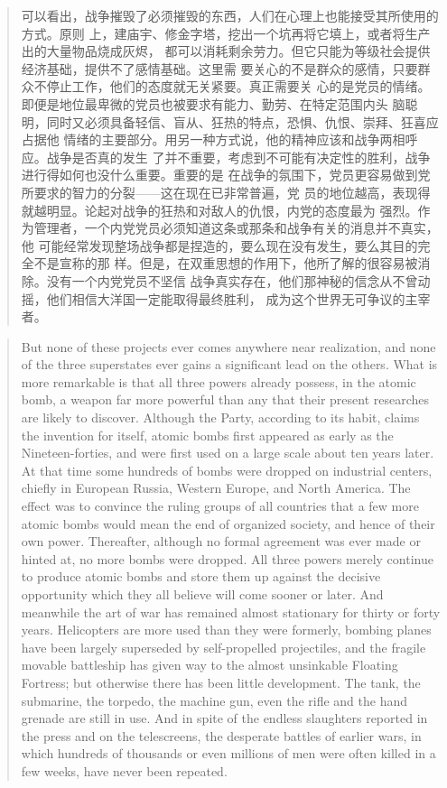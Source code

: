 \begin{paracol}{2}
\switchcolumn

\begin{quotation}
可以看出，战争摧毁了必须摧毁的东西，人们在心理上也能接受其所使用的方式。原则
上，建庙宇、修金字塔，挖出一个坑再将它填上，或者将生产出的大量物品烧成灰烬，
都可以消耗剩余劳力。但它只能为等级社会提供经济基础，提供不了感情基础。这里需
要关心的不是群众的感情，只要群众不停止工作，他们的态度就无关紧要。真正需要关
心的是党员的情绪。即便是地位最卑微的党员也被要求有能力、勤劳、在特定范围内头
脑聪明，同时又必须具备轻信、盲从、狂热的特点，恐惧、仇恨、崇拜、狂喜应占据他
情绪的主要部分。用另一种方式说，他的精神应该和战争两相呼应。战争是否真的发生
了并不重要，考虑到不可能有决定性的胜利，战争进行得如何也没什么重要。重要的是
在战争的氛围下，党员更容易做到党所要求的智力的分裂——这在现在已非常普遍，党
员的地位越高，表现得就越明显。论起对战争的狂热和对敌人的仇恨，内党的态度最为
强烈。作为管理者，一个内党党员必须知道这条或那条和战争有关的消息并不真实，他
可能经常发现整场战争都是捏造的，要么现在没有发生，要么其目的完全不是宣称的那
样。但是，在双重思想的作用下，他所了解的很容易被消除。没有一个内党党员不坚信
战争真实存在，他们那神秘的信念从不曾动摇，他们相信大洋国一定能取得最终胜利，
成为这个世界无可争议的主宰者。
\end{quotation}

\switchcolumn*

\begin{quotation}
But none of these projects ever comes anywhere near realization, and
none of the three superstates ever gains a significant lead on the
others. What is more remarkable is that all three powers already
possess, in the atomic bomb, a weapon far more powerful than any that
their present researches are likely to discover. Although the Party,
according to its habit, claims the invention for itself, atomic bombs
first appeared as early as the Nineteen-forties, and were first used on
a large scale about ten years later. At that time some hundreds of bombs
were dropped on industrial centers, chiefly in European Russia, Western
Europe, and North America. The effect was to convince the ruling groups
of all countries that a few more atomic bombs would mean the end of
organized society, and hence of their own power. Thereafter, although no
formal agreement was ever made or hinted at, no more bombs were dropped.
All three powers merely continue to produce atomic bombs and store them
up against the decisive opportunity which they all believe will come
sooner or later. And meanwhile the art of war has remained almost
stationary for thirty or forty years. Helicopters are more used than
they were formerly, bombing planes have been largely superseded by
self-propelled projectiles, and the fragile movable battleship has given
way to the almost unsinkable Floating Fortress; but otherwise there has
been little development. The tank, the submarine, the torpedo, the
machine gun, even the rifle and the hand grenade are still in use. And
in spite of the endless slaughters reported in the press and on the
telescreens, the desperate battles of earlier wars, in which hundreds of
thousands or even millions of men were often killed in a few weeks, have
never been repeated.
\end{quotation}


\end{paracol}
